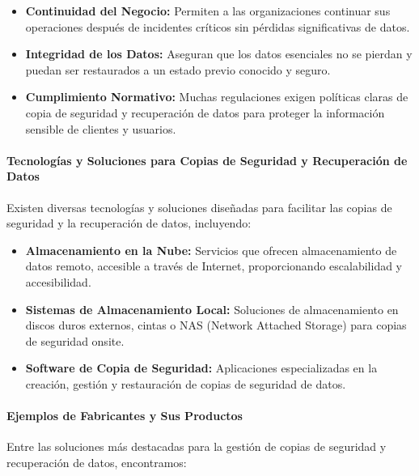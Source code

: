 \begin{itemize}
    \item \textbf{Continuidad del Negocio:} Permiten a las organizaciones continuar sus operaciones después de incidentes críticos sin pérdidas significativas de datos.
    \item \textbf{Integridad de los Datos:} Aseguran que los datos esenciales no se pierdan y puedan ser restaurados a un estado previo conocido y seguro.
    \item \textbf{Cumplimiento Normativo:} Muchas regulaciones exigen políticas claras de copia de seguridad y recuperación de datos para proteger la información sensible de clientes y usuarios.
\end{itemize}

\paragraph{Tecnologías y Soluciones para Copias de Seguridad y Recuperación de Datos}

Existen diversas tecnologías y soluciones diseñadas para facilitar las copias de seguridad y la recuperación de datos, incluyendo:

\begin{itemize}
    \item \textbf{Almacenamiento en la Nube:} Servicios que ofrecen almacenamiento de datos remoto, accesible a través de Internet, proporcionando escalabilidad y accesibilidad.
    \item \textbf{Sistemas de Almacenamiento Local:} Soluciones de almacenamiento en discos duros externos, cintas o NAS (Network Attached Storage) para copias de seguridad onsite.
    \item \textbf{Software de Copia de Seguridad:} Aplicaciones especializadas en la creación, gestión y restauración de copias de seguridad de datos.
\end{itemize}

\paragraph{Ejemplos de Fabricantes y Sus Productos}

Entre las soluciones más destacadas para la gestión de copias de seguridad y recuperación de datos, encontramos:

